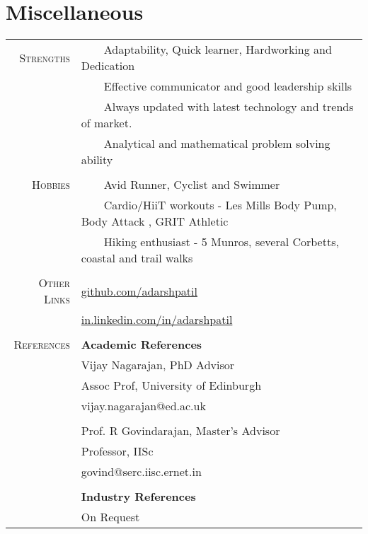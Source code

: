 \documentclass[a4paper,10pt]{article} %
\newcommand{\tabitem}{~~\llap{\textbullet}~~}
\begin{document}


\section{Miscellaneous}
\begin{tabular}{rl}
\textsc{Strengths} & \tabitem Adaptability, Quick learner, Hardworking and Dedication\\
& \tabitem Effective communicator and good leadership skills \\
& \tabitem Always updated with latest technology and trends of market.\\
& \tabitem Analytical and mathematical problem solving ability \\
& \\
\textsc{Hobbies} & \tabitem Avid Runner, Cyclist and Swimmer\\
& \tabitem Cardio/HiiT workouts - Les Mills Body Pump, Body Attack , GRIT Athletic\\
& \tabitem Hiking enthusiast - 5 Munros, several Corbetts, coastal and trail walks\\
& \\
\textsc{Other Links} & \href{https://github.com/adarshpatil}{github.com/adarshpatil} \\
& \href{http://in.linkedin.com/in/adarshpatil}{in.linkedin.com/in/adarshpatil}\\
&\\
\textsc{References} & \textbf{Academic References} \\
& Vijay Nagarajan, PhD Advisor \\
& Assoc Prof, University of Edinburgh\\
& vijay.nagarajan@ed.ac.uk \\
&\\
& Prof. R Govindarajan, Master's Advisor \\
& Professor, IISc\\
& govind@serc.iisc.ernet.in \\
&\\

& \textbf{Industry References} \\
& On Request \\
\end{tabular}
\end{document}
